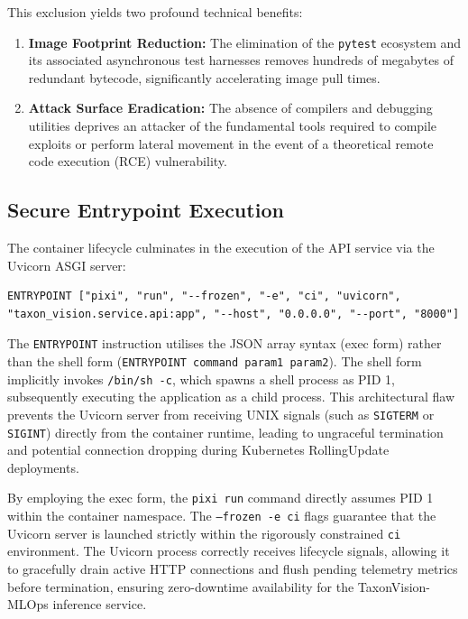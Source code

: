 This exclusion yields two profound technical benefits:
\begin{enumerate}
    \item \textbf{Image Footprint Reduction:} The elimination of the \texttt{pytest} ecosystem and its associated asynchronous test harnesses removes hundreds of megabytes of redundant bytecode, significantly accelerating image pull times.
    \item \textbf{Attack Surface Eradication:} The absence of compilers and debugging utilities deprives an attacker of the fundamental tools required to compile exploits or perform lateral movement in the event of a theoretical remote code execution (RCE) vulnerability.
\end{enumerate}

\subsection{Secure Entrypoint Execution}

The container lifecycle culminates in the execution of the API service via the Uvicorn ASGI server:

\begin{verbatim}
ENTRYPOINT ["pixi", "run", "--frozen", "-e", "ci", "uvicorn", "taxon_vision.service.api:app", "--host", "0.0.0.0", "--port", "8000"]
\end{verbatim}

The \texttt{ENTRYPOINT} instruction utilises the JSON array syntax (exec form) rather than the shell form (\texttt{ENTRYPOINT command param1 param2}). The shell form implicitly invokes \texttt{/bin/sh -c}, which spawns a shell process as PID 1, subsequently executing the application as a child process. This architectural flaw prevents the Uvicorn server from receiving UNIX signals (such as \texttt{SIGTERM} or \texttt{SIGINT}) directly from the container runtime, leading to ungraceful termination and potential connection dropping during Kubernetes RollingUpdate deployments.

By employing the exec form, the \texttt{pixi run} command directly assumes PID 1 within the container namespace. The \texttt{--frozen -e ci} flags guarantee that the Uvicorn server is launched strictly within the rigorously constrained \texttt{ci} environment. The Uvicorn process correctly receives lifecycle signals, allowing it to gracefully drain active HTTP connections and flush pending telemetry metrics before termination, ensuring zero-downtime availability for the TaxonVision-MLOps inference service.

